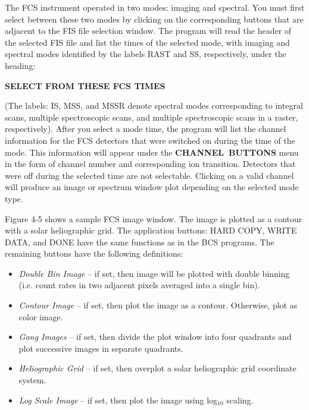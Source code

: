 {{{The FCS instrument operated in two modes: imaging and spectral. You must first
select between these two modes by clicking on the corresponding buttons that
are adjacent to the FIS file selection window. The program will read the header
of the selected FIS file and list the times of the selected mode, with imaging
and spectral modes identified by the labels RAST and SS, respectively,  under
the heading: 
\newline
\newline
\centerline{\bf SELECT FROM THESE FCS TIMES} \noindent
\newline
\newline
(The labels: IS, MSS, and MSSR denote spectral modes  corresponding to integral
scans, multiple spectroscopic scans, and multiple spectroscopic scans in a
raster, respectively). After you select a mode time, the program  will list
the channel information for the FCS detectors that were switched on during the
time of the mode. This information will appear under the \hbox{\bf CHANNEL
BUTTONS} menu in the form of channel number and corresponding ion transition.
Detectors that were off during the selected time are not selectable. Clicking
on a valid channel will produce an image or spectrum window plot depending on
the selected mode type. 

Figure 4-5 shows a sample FCS image window. The image is plotted as a contour 
with
a solar heliographic grid. The application buttons: HARD COPY, WRITE DATA, and 
DONE
have the same functions as in the BCS programs. The remaining buttons have the
following definitions:
                              
\begin{itemize}

\item{\it Double Bin Image } -- if set, then image will be plotted
with double binning
(i.e. count rates in two adjacent pixels averaged into a single bin).

\item{\it Contour Image} -- if set, then plot the image as a contour.
Otherwise, plot as color image.

\item{\it Gang Images} -- if set, then divide the plot window into
four quadrants and plot successive images in separate quadrants.

\item{\it Heliographic Grid} -- if set, then overplot a solar 
heliographic grid coordinate system.

\item{\it Log Scale Image} -- if set, then plot the image
using log$_{10}$ scaling.


\end{itemize}}}}
